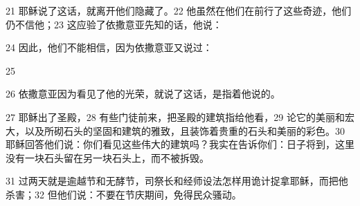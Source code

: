 21  耶稣说了这话，就离开他们隐藏了。22  他虽然在他们在前行了这些奇迹，他们仍不信他；23  这应验了依撒意亚先知的话，他说：\par

\par

24  因此，他们不能相信，因为依撒意亚又说过：\par

25  \par

26  依撒意亚因为看见了他的光荣，就说了这话，是指着他说的。\par

27  耶稣出了圣殿，28 有些门徒前来，把圣殿的建筑指给他看，29 论它的美丽和宏大，以及所砌石头的坚固和建筑的雅致，且装饰着贵重的石头和美丽的彩色。30  耶稣回答他们说：你们看见这些伟大的建筑吗？我实在告诉你们：日子将到，这里没有一块石头留在另一块石头上，而不被拆毁。\par

31  过两天就是逾越节和无酵节，司祭长和经师设法怎样用诡计捉拿耶稣，而把他杀害；32  但他们说：不要在节庆期间，免得民众骚动。\par

